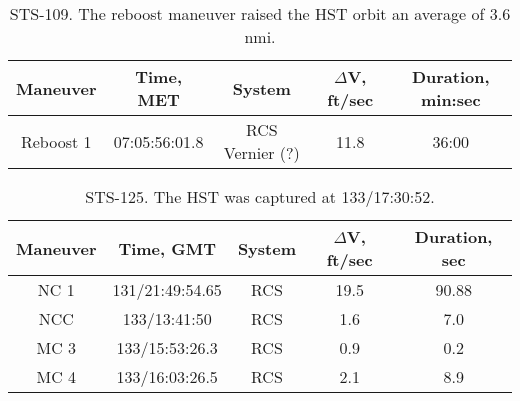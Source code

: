 \documentclass[onecolumn,10pt]{jhwhw}
\begin{document}
\begin{table}[t!]
\begin{center}
\begin{tabular}{|c |c |c |c |c|}
\hline
Maneuver & Time, MET & System & $\Delta$V, ft/sec & Duration, min:sec \\
\hline
Reboost 1 & 07:05:56:01.8 & RCS Vernier (?) & 11.8  & 36:00 \\ \hline
\end{tabular}
\end{center}
\caption{STS-109. The reboost maneuver raised the HST orbit an average of 3.6 nmi.}
\end{table}

\begin{table}[t!]
\begin{center}
\begin{tabular}{|c |c |c |c |c|}
\hline
Maneuver & Time, GMT & System & $\Delta$V, ft/sec & Duration, sec \\
\hline
NC 1 & 131/21:49:54.65 & RCS & 19.5 & 90.88   \\ \hline
NCC  & 133/13:41:50    & RCS &  1.6 & 7.0     \\ \hline
MC 3 & 133/15:53:26.3  & RCS &  0.9 & 0.2     \\ \hline
MC 4 & 133/16:03:26.5  & RCS &  2.1 & 8.9     \\ \hline
\end{tabular}
\end{center}
\caption{STS-125. The HST was captured at 133/17:30:52.}
\end{table}
\end{document}
